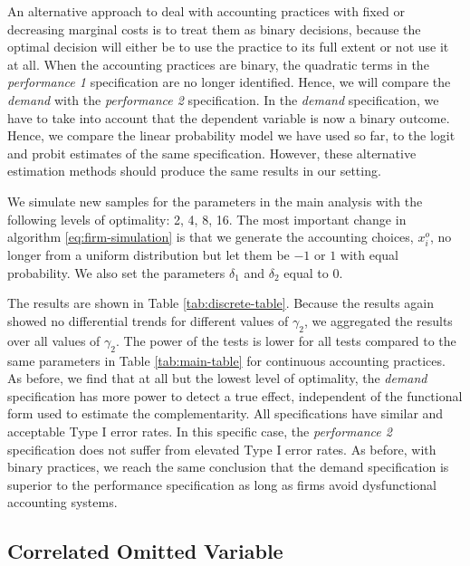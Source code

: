 \documentclass[12pt]{article}
\begin{document}
An alternative approach to deal with accounting practices with fixed or decreasing marginal costs is to treat them as binary decisions, because the optimal decision will either be to use the practice to its full extent or not use it at all. When the accounting practices are binary, the quadratic terms in the \emph{performance 1} specification are no longer identified. Hence, we will compare the \emph{demand} with the \emph{performance 2} specification. In the \emph{demand} specification, we have to take into account that the dependent variable is now a binary outcome. Hence, we compare the linear probability model we have used so far, to the logit and probit estimates of the same specification. However, these alternative estimation methods should produce the same results in our setting. 

We simulate new samples for the parameters in the main analysis with the following levels of optimality: 2, 4, 8, 16. The most important change in algorithm \eqref{eq:firm-simulation} is that we generate the accounting choices, $x_i^o$, no longer from a uniform distribution but let them be $-1$ or $1$ with equal probability. We also set the parameters $\delta_1$ and $\delta_2$ equal to $0$.

The results are shown in Table \ref{tab:discrete-table}. Because the results again showed no differential trends for different values of $\gamma_2$, we aggregated the results over all values of $\gamma_2$. The power of the tests is lower for all tests compared to the same parameters in Table \ref{tab:main-table} for continuous accounting practices. As before, we find that at all but the lowest level of optimality, the \emph{demand} specification has more power to detect a true effect, independent of the functional form used to estimate the complementarity. All specifications have similar and acceptable Type I error rates. In this specific case, the \emph{performance 2} specification does not suffer from elevated Type I error rates. As before, with binary practices, we reach the same conclusion that the demand specification is superior to the performance specification as long as firms avoid dysfunctional accounting systems. 



\subsection{Correlated Omitted Variable}\label{correlated-omitted}
\end{document}
